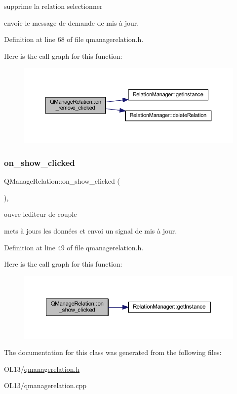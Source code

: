 supprime la relation selectionner 

envoie le message de demande de mis à jour. 

Definition at line 68 of file qmanagerelation.\+h.

Here is the call graph for this function\+:\nopagebreak
\begin{figure}[H]
\begin{center}
\leavevmode
\includegraphics[width=350pt]{class_q_manage_relation_a0ad8c5f51b68248b2d42e980d99e4820_cgraph}
\end{center}
\end{figure}
\mbox{\label{class_q_manage_relation_ab901c21b731bde77d9c1bc68780ec700}} 
\subsubsection{\texorpdfstring{on\+\_\+show\+\_\+clicked}{on\_show\_clicked}}
{\footnotesize\ttfamily Q\+Manage\+Relation\+::on\+\_\+show\+\_\+clicked (\begin{DoxyParamCaption}{ }\end{DoxyParamCaption})\hspace{0.3cm}{\ttfamily [inline]}, {\ttfamily [slot]}}



ouvre l\textquotesingle{}editeur de couple 

mets à jours les données et envoi un signal de mis à jour. 

Definition at line 49 of file qmanagerelation.\+h.

Here is the call graph for this function\+:\nopagebreak
\begin{figure}[H]
\begin{center}
\leavevmode
\includegraphics[width=350pt]{class_q_manage_relation_ab901c21b731bde77d9c1bc68780ec700_cgraph}
\end{center}
\end{figure}


The documentation for this class was generated from the following files\+:\begin{DoxyCompactItemize}
\item 
O\+L13/\hyperlink{qmanagerelation_8h}{qmanagerelation.\+h}\item 
O\+L13/qmanagerelation.\+cpp\end{DoxyCompactItemize}
